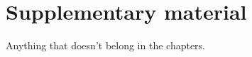 \chapter{Supplementary material}\label{app:supplement}

Anything that doesn't belong in the chapters.
